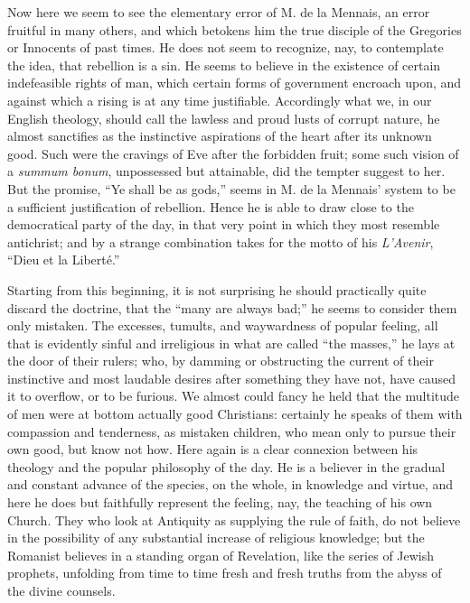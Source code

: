 Now here we seem to see the elementary error of
M. de la Mennais, an error fruitful in many others, and which betokens
him the true disciple of the Gregories or Innocents of past times. He
does not seem to recognize, nay, to contemplate the idea, that
rebellion is a sin. He seems to believe in the existence of
certain indefeasible rights of man, which certain forms of government
encroach upon, and against which a rising is at any time justifiable.
Accordingly what we, in our English theology, should call the lawless
and proud lusts of corrupt nature, he almost sanctifies as the
instinctive aspirations of the heart after its unknown good. Such were
the cravings of Eve after the forbidden fruit; some such vision of a \emph{summum
bonum}, unpossessed but attainable, did the tempter suggest to her.
But the promise, ``Ye shall be as gods,'' seems in M. de la Mennais'
system to be a sufficient justification of rebellion. Hence he is able
to draw close to the democratical party of the day, in that very point
in which they most resemble antichrist; and by a strange combination
takes for the motto of his \emph{L'Avenir}, ``Dieu et la Liberté.''

Starting from this beginning, it is not
surprising he should practically quite discard the doctrine, that the ``many
are always bad;'' he seems to consider them only mistaken. The
excesses, tumults, and waywardness of popular feeling, all that is
evidently sinful and irreligious in what are called ``the masses,'' he
lays at the door of their rulers; who, by damming or obstructing the
current of their instinctive and most laudable desires after something
they have not, have caused it to overflow, or to be furious. We almost
could fancy he held that the multitude of men were at bottom actually
good Christians: certainly he speaks of them with compassion and
tenderness, as mistaken children, who mean only to pursue their own
good, but know not how. Here again is a clear connexion between his
theology and the popular philosophy of the day. He is a believer in
the gradual and constant advance of the species, on the whole, in
knowledge and virtue, and here he does but faithfully represent the feeling, nay, the teaching of his own Church. They who look at
Antiquity as supplying the rule of faith, do not believe in the
possibility of any substantial increase of religious knowledge; but
the Romanist believes in a standing organ of Revelation, like the
series of Jewish prophets, unfolding from time to time fresh and fresh
truths from the abyss of the divine counsels.

